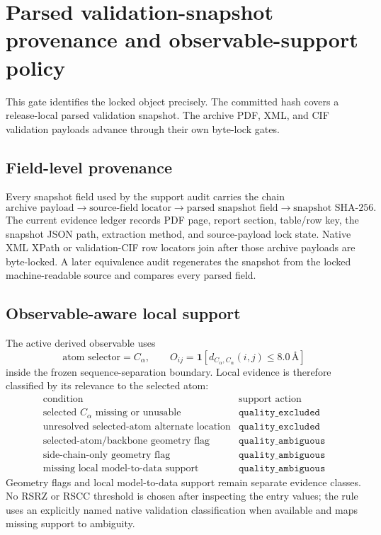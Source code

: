 \section{Parsed validation-snapshot provenance and observable-support policy}

This gate identifies the locked object precisely.  The committed hash covers a
release-local parsed validation snapshot.  The archive PDF, XML, and CIF
validation payloads advance through their own byte-lock gates.

\subsection{Field-level provenance}

Every snapshot field used by the support audit carries the chain
\[
\text{archive payload}
\longrightarrow
\text{source-field locator}
\longrightarrow
\text{parsed snapshot field}
\longrightarrow
\text{snapshot SHA-256}.
\]
The current evidence ledger records PDF page, report section, table/row key, the
snapshot JSON path, extraction method, and source-payload lock state.  Native XML
XPath or validation-CIF row locators join after those archive payloads are
byte-locked.  A later equivalence audit regenerates the snapshot from the locked
machine-readable source and compares every parsed field.

\subsection{Observable-aware local support}

The active derived observable uses
\[
\text{atom selector}=C_\alpha,
\qquad
O_{ij}=\mathbf 1\!\left[d_{C_\alpha,C_\alpha}(i,j)\leq 8.0\,\text{\AA}\right]
\]
inside the frozen sequence-separation boundary.  Local evidence is therefore
classified by its relevance to the selected atom:
\[
\begin{array}{c|c}
\text{condition} & \text{support action}\\ \hline
\text{selected }C_\alpha\text{ missing or unusable} & \texttt{quality\_excluded}\\
\text{unresolved selected-atom alternate location} & \texttt{quality\_excluded}\\
\text{selected-atom/backbone geometry flag} & \texttt{quality\_ambiguous}\\
\text{side-chain-only geometry flag} & \texttt{quality\_ambiguous}\\
\text{missing local model-to-data support} & \texttt{quality\_ambiguous}
\end{array}
\]
Geometry flags and local model-to-data support remain separate evidence classes.
No RSRZ or RSCC threshold is chosen after inspecting the entry values; the rule
uses an explicitly named native validation classification when available and
maps missing support to ambiguity.

